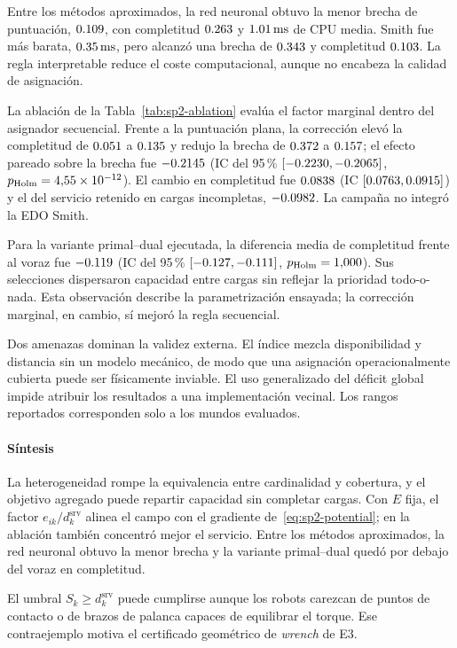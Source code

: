 Entre los métodos aproximados, la red neuronal obtuvo la menor brecha de puntuación, $0.109$, con completitud $0.263$ y $1.01\,\mathrm{ms}$ de CPU media. Smith fue más barata, $0.35\,\mathrm{ms}$, pero alcanzó una brecha de $0.343$ y completitud $0.103$. La regla interpretable reduce el coste computacional, aunque no encabeza la calidad de asignación.

La ablación de la Tabla~\ref{tab:sp2-ablation} evalúa el factor marginal dentro del asignador secuencial. Frente a la puntuación plana, la corrección elevó la completitud de $0.051$ a $0.135$ y redujo la brecha de $0.372$ a $0.157$; el efecto pareado sobre la brecha fue $-0.2145$ (IC del 95\,\% $[-0.2230,-0.2065]$, $p_{\mathrm{Holm}}=4{,}55\times10^{-12}$). El cambio en completitud fue $0.0838$ (IC $[0.0763,0.0915]$) y el del servicio retenido en cargas incompletas, $-0.0982$. La campaña no integró la EDO Smith.

\begin{table}[!htbp]
  \centering
  \caption{Ablación pareada de las puntuaciones plana y marginal en E2.}
  \label{tab:sp2-ablation}
  \resizebox{0.82\textwidth}{!}{}
\end{table}

Para la variante primal--dual ejecutada, la diferencia media de completitud frente al voraz fue $-0.119$ (IC del 95\,\% $[-0.127,-0.111]$, $p_{\mathrm{Holm}}=1{,}000$). Sus selecciones dispersaron capacidad entre cargas sin reflejar la prioridad todo-o-nada. Esta observación describe la parametrización ensayada; la corrección marginal, en cambio, sí mejoró la regla secuencial.

Dos amenazas dominan la validez externa. El índice mezcla disponibilidad y distancia sin un modelo mecánico, de modo que una asignación operacionalmente cubierta puede ser físicamente inviable. El uso generalizado del déficit global impide atribuir los resultados a una implementación vecinal. Los rangos reportados corresponden solo a los mundos evaluados.

\paragraph{Síntesis}

La heterogeneidad rompe la equivalencia entre cardinalidad y cobertura, y el objetivo agregado puede repartir capacidad sin completar cargas. Con $E$ fija, el factor $e_{ik}/d_k^{\mathrm{srv}}$ alinea el campo con el gradiente de~\eqref{eq:sp2-potential}; en la ablación también concentró mejor el servicio. Entre los métodos aproximados, la red neuronal obtuvo la menor brecha y la variante primal--dual quedó por debajo del voraz en completitud.

El umbral $S_k\geq d_k^{\mathrm{srv}}$ puede cumplirse aunque los robots carezcan de puntos de contacto o de brazos de palanca capaces de equilibrar el torque. Ese contraejemplo motiva el certificado geométrico de \emph{wrench} de E3.

